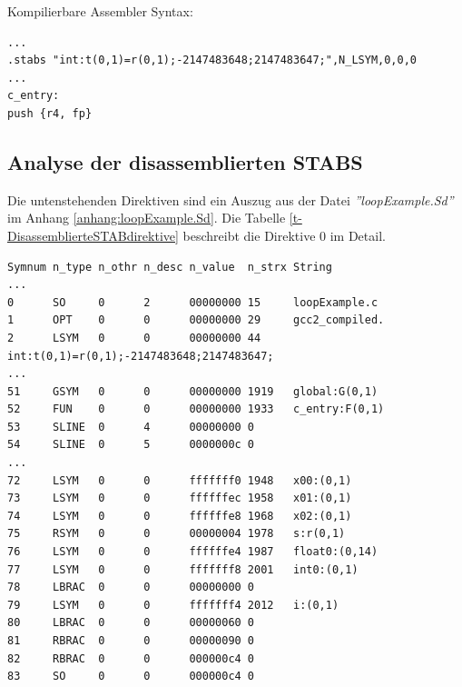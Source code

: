 Kompilierbare Assembler Syntax:
\lstset{language=plain}
\begin{lstlisting}
...
.stabs "int:t(0,1)=r(0,1);-2147483648;2147483647;",N_LSYM,0,0,0
...
c_entry:
push {r4, fp}
\end{lstlisting}


\subsection{Analyse der disassemblierten STABS}
\FloatBarrier

Die untenstehenden Direktiven sind ein Auszug aus der Datei \textit{''loopExample.Sd''} im Anhang \ref{anhang:loopExample.Sd}.
Die Tabelle \ref{t-DisassemblierteSTABdirektive} beschreibt die Direktive 0 im Detail.
\lstset{language=plain}
\begin{lstlisting}
Symnum n_type n_othr n_desc n_value  n_strx String
...
0      SO     0      2      00000000 15     loopExample.c
1      OPT    0      0      00000000 29     gcc2_compiled.
2      LSYM   0      0      00000000 44     int:t(0,1)=r(0,1);-2147483648;2147483647;
...
51     GSYM   0      0      00000000 1919   global:G(0,1)
52     FUN    0      0      00000000 1933   c_entry:F(0,1)
53     SLINE  0      4      00000000 0 
54     SLINE  0      5      0000000c 0     
...
72     LSYM   0      0      fffffff0 1948   x00:(0,1)
73     LSYM   0      0      ffffffec 1958   x01:(0,1)
74     LSYM   0      0      ffffffe8 1968   x02:(0,1)
75     RSYM   0      0      00000004 1978   s:r(0,1)
76     LSYM   0      0      ffffffe4 1987   float0:(0,14)
77     LSYM   0      0      fffffff8 2001   int0:(0,1)
78     LBRAC  0      0      00000000 0      
79     LSYM   0      0      fffffff4 2012   i:(0,1)
80     LBRAC  0      0      00000060 0      
81     RBRAC  0      0      00000090 0      
82     RBRAC  0      0      000000c4 0      
83     SO     0      0      000000c4 0 
\end{lstlisting}


